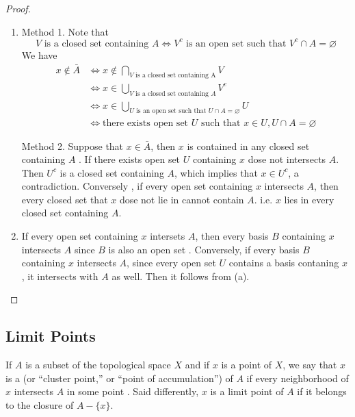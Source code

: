 \documentclass[../main.tex]{subfiles}
\begin{document}
\begin{proof}
    \begin{enumerate}
        \item[(a)] Method 1. Note that \[
        V \text{ is a closed set containing }A \iff V^{c} \text{ is an open set such that  } V^{c} \cap A= \varnothing
        \]We have \[
      \begin{aligned}
        x \not \in \bar{A}&\iff x\not \in \bigcap _{V \text{ is a closed set containing A}}V \\ 
         & \iff  x \in  \bigcup _{V \text{ is a closed set containing } A}V^{c}\\ 
          &\iff x \in \bigcup _{U \text{ is an open set such that  } U\cap A= \varnothing}U\\ 
           &\iff \text{there exists open set } U \text{ such that } x\in U, U\cap A= \varnothing
      \end{aligned}
        \]

        Method 2. Suppose that \(  x \in  \bar{A}  \), then \(  x  \)  is contained in any closed set containing \(  A  \) . If there exists open set \(  U  \) containing \(  x  \) dose not intersects \(  A  \). Then \(  U^{c}  \) is a closed set containing \(  A  \), which implies that \(  x \in U^{c}  \), a contradiction. Conversely , if every open set containing \(  x  \) intersects \(  A  \), then every closed  set that \(  x  \) dose not lie  in cannot contain \(  A  \). i.e. \(  x  \) lies in every closed set containing \(  A  \).       

        \item[(b)] If every open set containing \(  x  \) intersets \(  A  \), then every basis \(  B  \) containing \(  x  \) intersects \(  A  \) since \(  B  \) is also an open set . Conversely, if every basis \(  B  \) containing \(  x  \) intersects \(  A  \),    since every open set \(  U  \)  contains a basis contaning \(  x  \) , it intersects with \(  A  \) as well.      Then it follows from (a).
    \end{enumerate}
    
\end{proof}

\subsection{Limit Points}

\begin{definition}{}{}
    If $A$ is a subset of the topological space $X$ and if $x$ is a point of $X$, we say that $x$ is a  (or ``cluster point,'' or ``point of accumulation'') of $A$ if every neighborhood of $x$ intersects $A$ in some point . Said differently, $x$ is a limit point of $A$ if it belongs to the closure of $A - \{x\}$. 
\end{definition}
\end{document}

